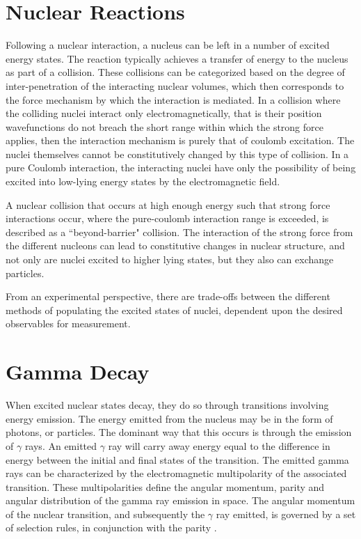 \section{Nuclear Reactions}

Following a nuclear interaction, a nucleus can be left in a number of excited energy states. The reaction typically achieves a transfer of energy to the nucleus as part of a collision. These collisions can be categorized based on the degree of inter-penetration of the interacting nuclear volumes, which then corresponds to the force mechanism by which the interaction is mediated. In a collision where the colliding nuclei interact only electromagnetically, that is their position wavefunctions do not breach the short range within which the strong force applies, then the interaction mechanism is purely that of coulomb excitation. The nuclei themselves cannot be constitutively changed by this type of collision. In a pure Coulomb interaction, the interacting nuclei have only the possibility of being excited into low-lying energy states by the electromagnetic field. 

A nuclear collision that occurs at high enough energy such that strong force interactions occur, where the pure-coulomb interaction range is exceeded, is described as a ``beyond-barrier" collision. The interaction of the strong force from the different nucleons can lead to constitutive changes in nuclear structure, and not only are nuclei excited to higher lying states, but they also can exchange particles. 

From an experimental perspective, there are trade-offs between the different methods of populating the excited states of nuclei, dependent upon the desired observables for measurement. 

\section{Gamma Decay}

When excited nuclear states decay, they do so through transitions involving energy emission. The energy emitted from the nucleus may be in the form of photons, or particles. The dominant way that this occurs is through the emission of $\gamma$ rays. An emitted $\gamma$ ray will carry away energy equal to the difference in energy between the initial and final states of the transition. The emitted gamma rays can be characterized by the electromagnetic multipolarity of the associated transition. These multipolarities define the angular momentum, parity and angular distribution of the gamma ray emission in space. The angular momentum of the nuclear transition, and subsequently the $\gamma$ ray emitted, is governed by a set of selection rules, in conjunction with the parity \cite{KraneText}.

